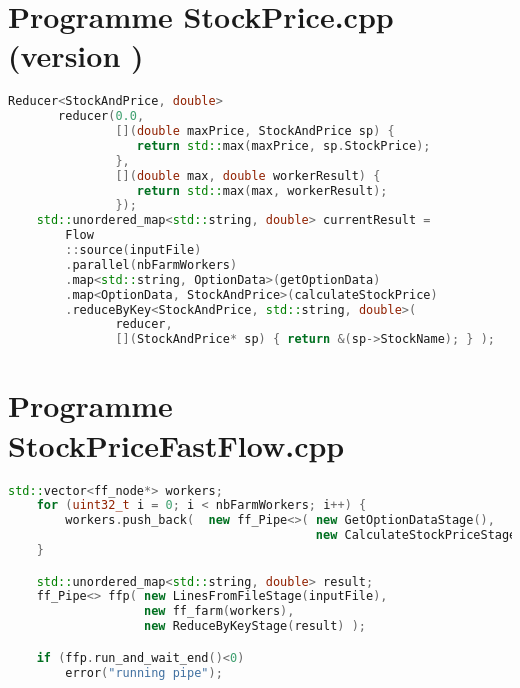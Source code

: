 \section{Programme {StockPrice.cpp} (version \ppff)}
\begin{lstlisting}[gobble=4,basicstyle=\ttfamily\footnotesize,language=c++]
    Reducer<StockAndPrice, double>
       reducer(0.0, 
               [](double maxPrice, StockAndPrice sp) {
                  return std::max(maxPrice, sp.StockPrice);
               },
               [](double max, double workerResult) { 
                  return std::max(max, workerResult);
               });
    std::unordered_map<std::string, double> currentResult =
        Flow
        ::source(inputFile)
        .parallel(nbFarmWorkers)
        .map<std::string, OptionData>(getOptionData)
        .map<OptionData, StockAndPrice>(calculateStockPrice)
        .reduceByKey<StockAndPrice, std::string, double>(
               reducer, 
               [](StockAndPrice* sp) { return &(sp->StockName); } );
\end{lstlisting}

\newpage
\section{Programme {StockPriceFastFlow.cpp}}
\begin{lstlisting}[gobble=4,basicstyle=\ttfamily\footnotesize,language=c++]
    std::vector<ff_node*> workers;
    for (uint32_t i = 0; i < nbFarmWorkers; i++) {
        workers.push_back(  new ff_Pipe<>( new GetOptionDataStage(),
                                           new CalculateStockPriceStage() ) );
    }        

    std::unordered_map<std::string, double> result;
    ff_Pipe<> ffp( new LinesFromFileStage(inputFile),
                   new ff_farm(workers),
                   new ReduceByKeyStage(result) );

    if (ffp.run_and_wait_end()<0)
        error("running pipe");
\end{lstlisting}
